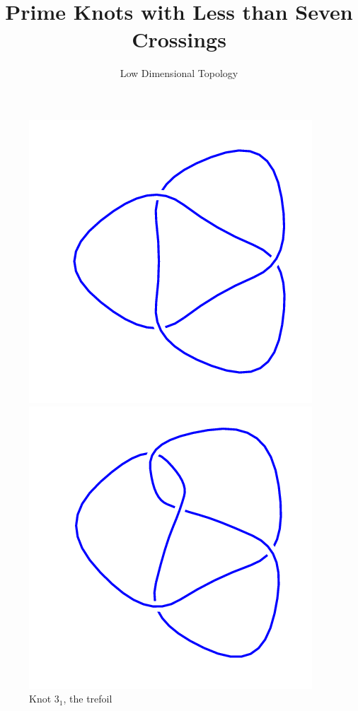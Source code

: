 \documentclass{article}
\title{Prime Knots with Less than Seven Crossings}
\author{Low Dimensional Topology}
\begin{document}
\maketitle

\begin{figure}[!htb]
\includegraphics[width=\linewidth]{3_1.png}
\caption{Knot $3_1$, the trefoil}
\endminipage\hfill
{}
\includegraphics[width=\linewidth]{4_1.png}

\end{figure}
\end{document}
